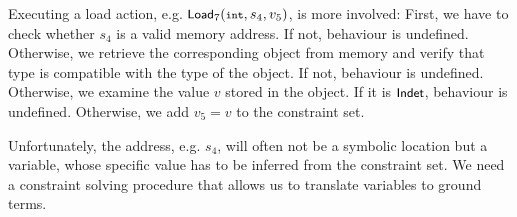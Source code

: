 \documentclass[a4paper,12pt]{scrbook}
\theoremstyle{plain}
\theoremstyle{definition}
\newcommand{\sem}[1]{{\small{\textsf{#1}}}}
\newcommand{\cc}[1]{{\text{\footnotesize\ttfamily{#1}}}}
\begin{document}
Executing a load action, e.g. $\sem{Load}_{7}(\cc{int}, s_{4}, v_{5})$, is more
involved: First, we have to check whether $s_4$ is a valid memory address. If
not, behaviour is undefined. Otherwise, we retrieve the corresponding object from
memory and verify that type \cc{int} is compatible with the type of the object. If
not, behaviour is undefined. Otherwise, we examine the value $v$ stored in the
object. If it is $\sem{Indet}$, behaviour is undefined. Otherwise, we add $v_5 =
v$ to the constraint set.

Unfortunately, the address, e.g. $s_{4}$, will often not be a symbolic location
but a variable, whose specific value has to be inferred from the constraint
set. We need a constraint solving procedure that allows us to translate
variables to ground terms.


\end{document}
